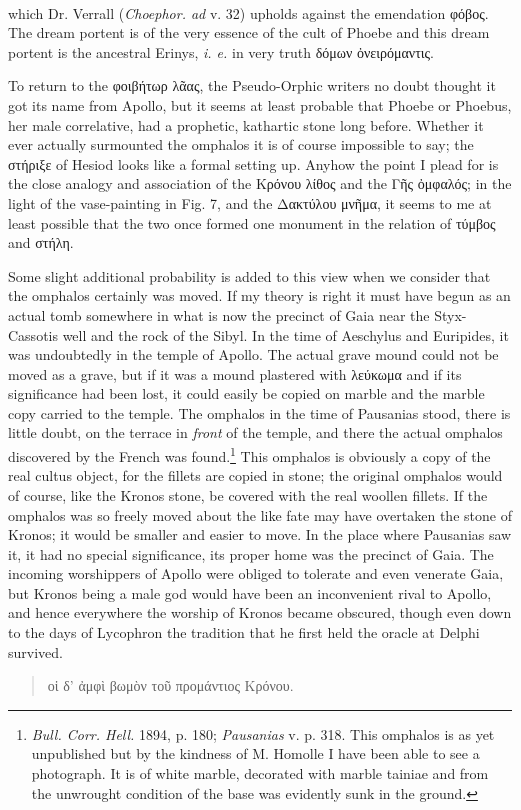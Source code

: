 \documentclass[a4paper, 11pt, oneside, polutonikogreek, english]{article}
\begin{document}
\paragraph{}
which Dr. Verrall (\emph{Choephor. ad} v. 32) upholds against the emendation φόβος. The dream portent is of the very essence of the cult of Phoebe and this dream portent is the ancestral Erinys, \emph{i. e.} in very truth δόμων ὀνειρόμαντις.

To return to the φοιβήτωρ λᾶας, the Pseudo-Orphic writers no doubt thought it got its name from Apollo, but it seems at least probable that Phoebe or Phoebus, her male correlative, had a prophetic, kathartic stone long before. Whether it ever actually surmounted the omphalos it is of course impossible to say; the στήριξε of Hesiod looks like a formal setting up. Anyhow the point I plead for is the close analogy and association of the Κρόνου λίθος and the Γῆς ὀμφαλός; in the light of the vase-painting in Fig. 7, and the Δακτύλου μνῆμα, it seems to me at least possible that the two once formed one monument in the relation of τύμβος and στήλη.

Some slight additional probability is added to this view when we consider that the omphalos certainly was moved. If my theory is right it must have begun as an actual tomb somewhere in what is now the precinct of Gaia near the Styx-Cassotis well and the rock of the Sibyl. In the time of Aeschylus and Euripides, it was undoubtedly in the temple of Apollo. The actual grave mound could not be moved as a grave, but if it was a mound plastered with λεύκωμα and if its significance had been lost, it could easily be copied on marble and the marble copy carried to the temple. The omphalos in the time of Pausanias stood, there is little doubt, on the terrace in \emph{front} of the temple, and there the actual omphalos discovered by the French was found.\footnote{\emph{Bull. Corr. Hell.} 1894, p. 180; \emph{Pausanias} v. p. 318. This omphalos is as yet unpublished but by the kindness of M. Homolle I have been able to see a photograph. It is of white marble, decorated with marble tainiae and from the unwrought condition of the base was evidently sunk in the ground.} This omphalos is obviously a copy of the real cultus object, for the fillets are copied in stone; the original omphalos would of course, like the Kronos stone, be covered with the real woollen fillets. If the omphalos was so freely moved about the like fate may have overtaken the stone of Kronos; it would be smaller and easier to move. In the place where Pausanias saw it, it had no special significance, its proper home was the precinct of Gaia. The incoming worshippers of Apollo were obliged to tolerate and even venerate Gaia, but Kronos being a male god would have been an inconvenient rival to Apollo, and hence everywhere the worship of Kronos became obscured, though even down to the days of Lycophron the tradition that he first held the oracle at Delphi survived.
\begin{quotation}
\large
οἱ δ' ἀμφὶ βωμὸν τοῦ προμάντιος Κρόνου.
\end{quotation}
\end{document}
